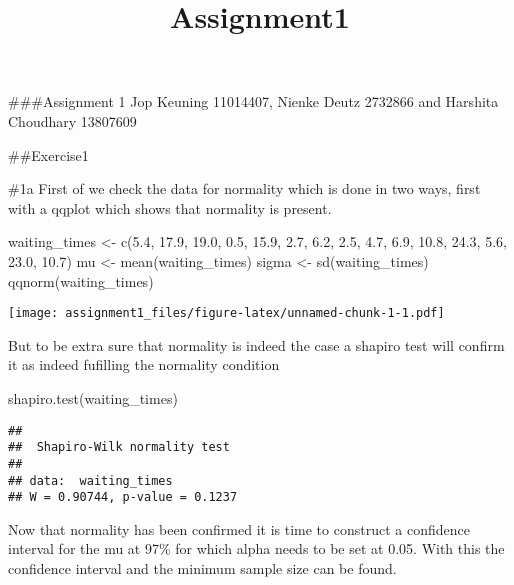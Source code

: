 \documentclass[
]{article}
\title{Assignment1}
\author{}
\date{\vspace{-2.5em}}
\newenvironment{Shaded}{\begin{snugshade}}{\end{snugshade}}
\newcommand{\FloatTok}[1]{\textcolor[rgb]{0.00,0.00,0.81}{#1}}
\newcommand{\FunctionTok}[1]{\textcolor[rgb]{0.00,0.00,0.00}{#1}}
\newcommand{\NormalTok}[1]{#1}
\newcommand{\OtherTok}[1]{\textcolor[rgb]{0.56,0.35,0.01}{#1}}
\begin{document}
\maketitle

\#\#\#Assignment 1 Jop Keuning 11014407, Nienke Deutz 2732866 and
Harshita Choudhary 13807609

\#\#Exercise1

\#1a First of we check the data for normality which is done in two ways,
first with a qqplot which shows that normality is present.

\begin{Shaded}
\begin{Highlighting}[]
\NormalTok{waiting\_times }\OtherTok{\textless{}{-}} \FunctionTok{c}\NormalTok{(}\FloatTok{5.4}\NormalTok{, }\FloatTok{17.9}\NormalTok{, }\FloatTok{19.0}\NormalTok{, }\FloatTok{0.5}\NormalTok{, }\FloatTok{15.9}\NormalTok{, }\FloatTok{2.7}\NormalTok{, }\FloatTok{6.2}\NormalTok{, }\FloatTok{2.5}\NormalTok{, }\FloatTok{4.7}\NormalTok{, }\FloatTok{6.9}\NormalTok{, }\FloatTok{10.8}\NormalTok{, }\FloatTok{24.3}\NormalTok{, }\FloatTok{5.6}\NormalTok{, }\FloatTok{23.0}\NormalTok{, }\FloatTok{10.7}\NormalTok{)}
\NormalTok{mu }\OtherTok{\textless{}{-}} \FunctionTok{mean}\NormalTok{(waiting\_times)}
\NormalTok{sigma }\OtherTok{\textless{}{-}} \FunctionTok{sd}\NormalTok{(waiting\_times)}
\FunctionTok{qqnorm}\NormalTok{(waiting\_times)}
\end{Highlighting}
\end{Shaded}

\texttt{[image: assignment1\_files/figure-latex/unnamed-chunk-1-1.pdf]}

But to be extra sure that normality is indeed the case a shapiro test
will confirm it as indeed fufilling the normality condition

\begin{Shaded}
\begin{Highlighting}[]
\FunctionTok{shapiro.test}\NormalTok{(waiting\_times)}
\end{Highlighting}
\end{Shaded}

\begin{verbatim}
## 
##  Shapiro-Wilk normality test
## 
## data:  waiting_times
## W = 0.90744, p-value = 0.1237
\end{verbatim}

Now that normality has been confirmed it is time to construct a
confidence interval for the mu at 97\% for which alpha needs to be set
at 0.05. With this the confidence interval and the minimum sample size
can be found.
\end{document}
